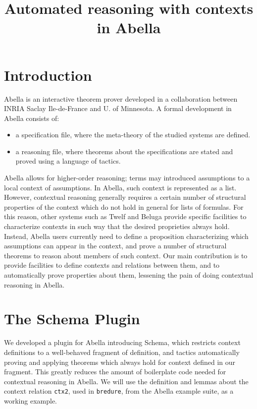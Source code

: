 \documentclass[nocopyrightspace,authoryear]{sigplanconf}
\title{Automated reasoning with contexts in Abella}
\begin{document}
\maketitle
\section{Introduction}

Abella \cite{abellasys} is an interactive theorem prover developed in a collaboration between INRIA Saclay Ile-de-France and U. of Minnesota. A formal development in Abella consists of:
\begin{itemize}
\item a specification file, where the meta-theory of the studied systems are defined.
\item a reasoning file, where theorems about the specifications are stated and proved using a language of tactics.
\end{itemize}

Abella allows for higher-order reasoning; terms may introduced assumptions to a local context of assumptions. In Abella, such context is represented as a list. However, contextual reasoning generally requires a certain number of structural properties of the context which do not hold in general for lists of formulas. For this reason, other systems such as Twelf \cite{twelfsys} and Beluga \cite{belugasys} provide specific facilities to characterize contexts in such way that the desired proprieties always hold. Instead, Abella users currently need to define a proposition characterizing which assumptions can appear in the context, and prove a number of structural theorems to reason about members of such context. Our main contribution is to provide facilities to define contexts and relations between them, and to automatically prove properties about them, lessening the pain of doing contextual reasoning in Abella.



\section{The Schema Plugin}

We developed a plugin for Abella introducing Schema, which restricts context definitions to a well-behaved fragment of definition, and tactics automatically proving and applying theorems which always hold for context defined in our fragment. This greatly reduces the amount of boilerplate code needed for contextual reasoning in Abella. We will use the definition and lemmas about the context relation \lstinline|ctx2|, used in \lstinline|bredure|, from the Abella example suite, as a working example.
\end{document}
